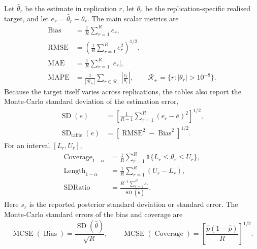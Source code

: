 \documentclass[11pt]{article}
\newcommand{\ind}{\mathbb{1}}
\begin{document}
Let $\widehat\theta_r$ be the estimate in replication $r$, let $\theta_r$ be
the replication-specific realised target, and let
$e_r=\widehat\theta_r-\theta_r$. The main scalar metrics are
\begin{align}
 \operatorname{Bias}&=\frac{1}{R}\sum_{r=1}^R e_r,\\
 \operatorname{RMSE}&=\left(\frac{1}{R}\sum_{r=1}^R e_r^2\right)^{1/2},\\
 \operatorname{MAE}&=\frac{1}{R}\sum_{r=1}^R|e_r|,\\
 \operatorname{MAPE}&=\frac{1}{|\mathcal{R}_+|}
 \sum_{r\in\mathcal{R}_+}\left|\frac{e_r}{\theta_r}\right|,
 \qquad \mathcal{R}_+=\{r:|\theta_r|>10^{-8}\}.
 \label{eq:scalar-metrics}
\end{align}
Because the target itself varies across replications, the tables also report
the Monte-Carlo standard deviation of the estimation error,
\begin{align}
 \operatorname{SD}(e)&=\left[\frac{1}{R-1}\sum_{r=1}^R
 (e_r-\overline e)^2\right]^{1/2},\\
 \operatorname{SD}_{\mathrm{table}}(e)&=
 \left[\operatorname{RMSE}^2-\operatorname{Bias}^2\right]^{1/2}.
 \label{eq:error-sd}
\end{align}
For an interval $[L_r,U_r]$,
\begin{align}
 \operatorname{Coverage}_{1-\alpha}
 &=\frac{1}{R}\sum_{r=1}^R
 \ind\{L_r\le\theta_r\le U_r\},\\
 \operatorname{Length}_{1-\alpha}
 &=\frac{1}{R}\sum_{r=1}^R(U_r-L_r),\\
 \operatorname{SDRatio}&=\frac{R^{-1}\sum_{r=1}^R s_r}
 {\operatorname{SD}(\widehat\theta)}.
 \label{eq:coverage}
\end{align}
Here $s_r$ is the reported posterior standard deviation or standard error. The
Monte-Carlo standard errors of the bias and coverage are
\begin{equation}
 \operatorname{MCSE}(\operatorname{Bias})
 =\frac{\operatorname{SD}(\widehat\theta)}{\sqrt R},
 \qquad
 \operatorname{MCSE}(\operatorname{Coverage})
 =\left[\frac{\widehat p(1-\widehat p)}{R}\right]^{1/2}.
 \label{eq:mcse}
\end{equation}
\end{document}
